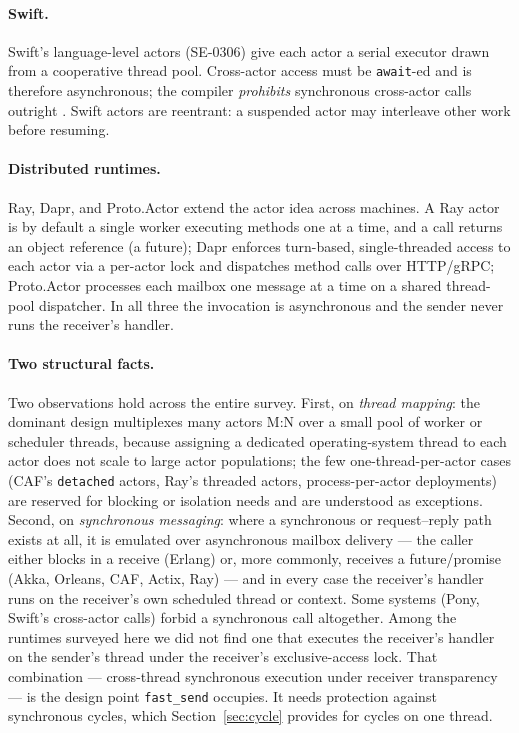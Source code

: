\documentclass[11pt]{article}
\newcommand{\fs}{\texttt{fast\_send}}
\begin{document}
\paragraph{Swift.} Swift's language-level actors (SE-0306) give each actor a
serial executor drawn from a cooperative thread pool. Cross-actor access must be
\texttt{await}-ed and is therefore asynchronous; the compiler \emph{prohibits}
synchronous cross-actor calls outright \cite{swift2021}. Swift actors are
reentrant: a suspended actor may interleave other work before resuming.

\paragraph{Distributed runtimes.} Ray, Dapr, and Proto.Actor extend the actor
idea across machines. A Ray actor is by default a single worker executing
methods one at a time, and a call returns an object reference (a future); Dapr
enforces turn-based, single-threaded access to each actor via a per-actor lock
and dispatches method calls over HTTP/gRPC; Proto.Actor processes each mailbox
one message at a time on a shared thread-pool dispatcher. In all three the
invocation is asynchronous and the sender never runs the receiver's handler.

\paragraph{Two structural facts.} Two observations hold across the entire
survey. First, on \emph{thread mapping}: the dominant design multiplexes many
actors M:N over a small pool of worker or scheduler threads, because assigning a
dedicated operating-system thread to each actor does not scale to large actor
populations; the few one-thread-per-actor cases (CAF's \texttt{detached} actors,
Ray's threaded actors, process-per-actor deployments) are reserved for blocking
or isolation needs and are understood as exceptions. Second, on
\emph{synchronous messaging}: where a synchronous or request--reply path exists
at all, it is emulated over asynchronous mailbox delivery --- the caller either
blocks in a receive (Erlang) or, more commonly, receives a future/promise (Akka,
Orleans, CAF, Actix, Ray) --- and in every case the receiver's handler runs on
the receiver's own scheduled thread or context. Some systems (Pony, Swift's
cross-actor calls) forbid a synchronous call altogether. Among the runtimes
surveyed here we did not find one that executes the receiver's handler on the
sender's thread under the receiver's exclusive-access lock. That combination --- cross-thread synchronous
execution under receiver transparency --- is the design point \fs{}
occupies. It needs protection against synchronous cycles, which
Section~\ref{sec:cycle} provides for cycles on one thread.
\end{document}
